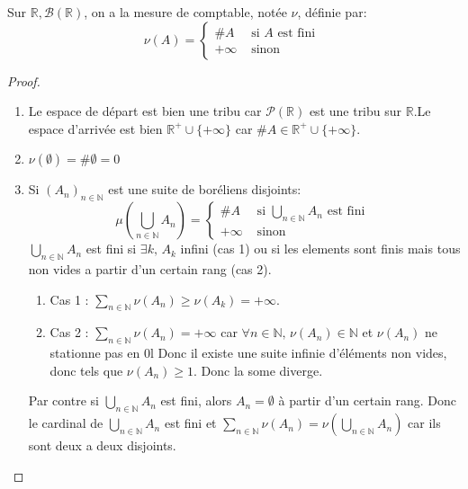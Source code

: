 \begin{example}
	Sur $\mathbb{R}, \mathscr{B}(\mathbb{R})$, on a la mesure de comptable, notée $\nu$, définie par:
	\begin{equation*}
		\nu(A) = \left\{
		\begin{array}{ll}
			\#A     & \text{ si } A \text{ est fini } \\
			+\infty & \text{ sinon }
		\end{array}
		\right.
	\end{equation*}
\end{example}

\begin{proof}
	\begin{enumerate}
		\item Le espace de départ est bien une tribu car $\mathscr{P}(\mathbb{R})$ est une tribu sur $\mathbb{R}$.Le
		      espace d'arrivée est bien $\mathbb{R}^+ \cup \{+\infty\}$ car $\#A \in \mathbb{R}^+ \cup \{+\infty\}$.
		\item $\nu(\emptyset) = \#\emptyset = 0$
		\item Si $(A_n)_{n \in \mathbb{N}}$ est une suite de boréliens disjoints:
		      \begin{equation*}
			      \mu(\bigcup\limits_{n \in \mathbb{N}} A_n) = \left\{\begin{array}{ll}
				      \#A     & \text{ si } \bigcup\limits_{n \in \mathbb{N}} A_n \text{ est fini } \\
				      +\infty & \text{ sinon }
			      \end{array}
			      \right.
		      \end{equation*}
		      $\bigcup\limits_{n \in \mathbb{N}} A_n$ est fini si $\exists k ,\, A_k$ infini (cas 1) ou si les elements sont
		      finis mais tous non vides a partir d'un certain rang (cas 2).
		      \begin{enumerate}
			      \item Cas 1 : $\sum\limits_{n \in \mathbb{N}} \nu(A_n) \geq \nu(A_k) = +\infty$.
			      \item Cas 2 : $\sum\limits_{n \in \mathbb{N}} \nu(A_n) = +\infty$ car
			            $\forall n \in \mathbb{N}, \, \nu(A_n) \in \mathbb{N}$ et $\nu(A_n)$ ne stationne pas en 0l Donc il existe une suite
			            infinie d'éléments non vides, donc tels que $\nu(A_n) \geq 1$. Donc la some diverge.
		      \end{enumerate}
		      Par contre si $\bigcup\limits_{n \in \mathbb{N}} A_n$ est fini, alors $A_n = \emptyset$ à partir d'un certain rang.
		      Donc le cardinal de $\bigcup\limits_{n \in \mathbb{N}} A_n$ est fini et $\sum\limits_{n \in \mathbb{N}} \nu(A_n) = \nu(\bigcup\limits_{n \in \mathbb{N}} A_n)$ car ils
		      sont deux a deux disjoints.
	\end{enumerate}
\end{proof}

